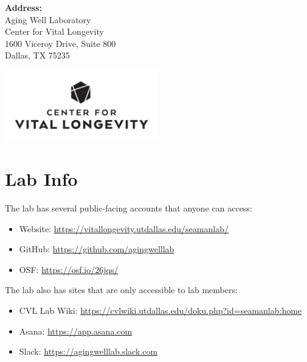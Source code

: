 \documentclass[]{book}
\providecommand{\tightlist}{%
  \setlength{\itemsep}{0pt}\setlength{\parskip}{0pt}}
\begin{document}
\textbf{Address:}\\
Aging Well Laboratory\\
Center for Vital Longevity\\
1600 Viceroy Drive, Suite 800\\
Dallas, TX 75235

\includegraphics[width=0.5\textwidth,height=\textheight]{images/CVL-B-Stacked.png}

\hypertarget{lab-info}{%
\section{Lab Info}\label{lab-info}}

The lab has several public-facing accounts that anyone can access:

\begin{itemize}
\tightlist
\item
  Website: \url{https://vitallongevity.utdallas.edu/seamanlab/}
\item
  GitHub: \url{https://github.com/agingwelllab}
\item
  OSF: \url{https://osf.io/26jqs/}
\end{itemize}

The lab also has sites that are only accessible to lab members:

\begin{itemize}
\tightlist
\item
  CVL Lab Wiki: \url{https://cvlwiki.utdallas.edu/doku.php?id=seamanlab:home}
\item
  Asana: \url{https://app.asana.com}
\item
  Slack: \url{https://agingwelllab.slack.com}
\end{itemize}
\end{document}

